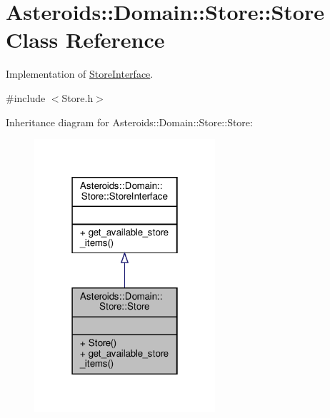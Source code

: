 \hypertarget{classAsteroids_1_1Domain_1_1Store_1_1Store}{}\section{Asteroids\+:\+:Domain\+:\+:Store\+:\+:Store Class Reference}
\label{classAsteroids_1_1Domain_1_1Store_1_1Store}


Implementation of \hyperlink{classAsteroids_1_1Domain_1_1Store_1_1StoreInterface}{Store\+Interface}.  




{\ttfamily \#include $<$Store.\+h$>$}



Inheritance diagram for Asteroids\+:\+:Domain\+:\+:Store\+:\+:Store\+:\nopagebreak
\begin{figure}[H]
\begin{center}
\leavevmode
\includegraphics[width=190pt]{classAsteroids_1_1Domain_1_1Store_1_1Store__inherit__graph}
\end{center}
\end{figure}


